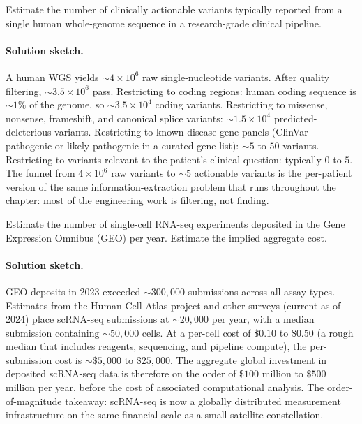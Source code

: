 \begin{exercise}
Estimate the number of clinically actionable variants typically
reported from a single human whole-genome sequence in a research-grade
clinical pipeline.

\paragraph{Solution sketch.}
A human WGS yields $\sim 4 \times 10^{6}$ raw single-nucleotide
variants. After quality filtering, $\sim 3.5 \times 10^{6}$ pass.
Restricting to coding regions: human coding sequence is $\sim 1\%$
of the genome, so $\sim 3.5 \times 10^{4}$ coding variants. Restricting
to missense, nonsense, frameshift, and canonical splice variants:
$\sim 1.5 \times 10^{4}$ predicted-deleterious variants. Restricting
to known disease-gene panels (ClinVar pathogenic or likely pathogenic
in a curated gene list): $\sim 5$ to $50$ variants. Restricting to
variants relevant to the patient's clinical question: typically $0$ to
$5$. The funnel from $4 \times 10^{6}$ raw variants to $\sim 5$
actionable variants is the per-patient version of the same
information-extraction problem that runs throughout the chapter: most
of the engineering work is filtering, not finding.
\end{exercise}

\begin{exercise}
Estimate the number of single-cell RNA-seq experiments deposited in
the Gene Expression Omnibus (GEO) per year. Estimate the implied
aggregate cost.

\paragraph{Solution sketch.}
GEO deposits in 2023 exceeded $\sim 300{,}000$ submissions across all
assay types. Estimates from the Human Cell Atlas project and other
surveys (current as of 2024) place scRNA-seq submissions at
$\sim 20{,}000$ per year, with a median submission containing
$\sim 50{,}000$ cells. At a per-cell cost of $\$0.10$ to $\$0.50$ (a
rough median that includes reagents, sequencing, and pipeline compute),
the per-submission cost is $\sim \$5{,}000$ to $\$25{,}000$. The
aggregate global investment in deposited scRNA-seq data is therefore
on the order of $\$100$ million to $\$500$ million per year, before
the cost of associated computational analysis. The order-of-magnitude
takeaway: scRNA-seq is now a globally distributed measurement
infrastructure on the same financial scale as a small satellite
constellation.
\end{exercise}

